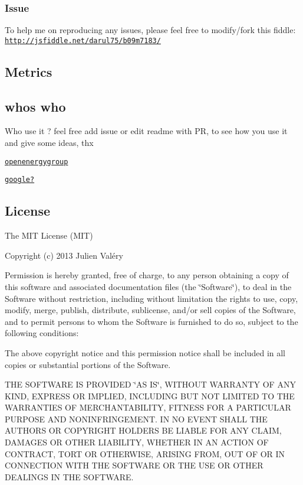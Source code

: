 \subsubsection*{Issue}

To help me on reproducing any issues, please feel free to modify/fork this fiddle\+: \href{http://jsfiddle.net/darul75/b09m7183/}{\tt http\+://jsfiddle.\+net/darul75/b09m7183/}

\subsection*{Metrics}

\href{https://nodei.co/npm/ng-slider/}{\tt }

\subsection*{who\textquotesingle{}s who}

Who use it ? feel free add issue or edit readme with PR, to see how you use it and give some ideas, thx

\href{https://www.openenergygroup.com/}{\tt openenergygroup}

\href{https://www.google.com}{\tt google?}

\subsection*{License}

The M\+IT License (M\+IT)

Copyright (c) 2013 Julien Valéry

Permission is hereby granted, free of charge, to any person obtaining a copy of this software and associated documentation files (the \char`\"{}\+Software\char`\"{}), to deal in the Software without restriction, including without limitation the rights to use, copy, modify, merge, publish, distribute, sublicense, and/or sell copies of the Software, and to permit persons to whom the Software is furnished to do so, subject to the following conditions\+:

The above copyright notice and this permission notice shall be included in all copies or substantial portions of the Software.

T\+HE S\+O\+F\+T\+W\+A\+RE IS P\+R\+O\+V\+I\+D\+ED \char`\"{}\+A\+S I\+S\char`\"{}, W\+I\+T\+H\+O\+UT W\+A\+R\+R\+A\+N\+TY OF A\+NY K\+I\+ND, E\+X\+P\+R\+E\+SS OR I\+M\+P\+L\+I\+ED, I\+N\+C\+L\+U\+D\+I\+NG B\+UT N\+OT L\+I\+M\+I\+T\+ED TO T\+HE W\+A\+R\+R\+A\+N\+T\+I\+ES OF M\+E\+R\+C\+H\+A\+N\+T\+A\+B\+I\+L\+I\+TY, F\+I\+T\+N\+E\+SS F\+OR A P\+A\+R\+T\+I\+C\+U\+L\+AR P\+U\+R\+P\+O\+SE A\+ND N\+O\+N\+I\+N\+F\+R\+I\+N\+G\+E\+M\+E\+NT. IN NO E\+V\+E\+NT S\+H\+A\+LL T\+HE A\+U\+T\+H\+O\+RS OR C\+O\+P\+Y\+R\+I\+G\+HT H\+O\+L\+D\+E\+RS BE L\+I\+A\+B\+LE F\+OR A\+NY C\+L\+A\+IM, D\+A\+M\+A\+G\+ES OR O\+T\+H\+ER L\+I\+A\+B\+I\+L\+I\+TY, W\+H\+E\+T\+H\+ER IN AN A\+C\+T\+I\+ON OF C\+O\+N\+T\+R\+A\+CT, T\+O\+RT OR O\+T\+H\+E\+R\+W\+I\+SE, A\+R\+I\+S\+I\+NG F\+R\+OM, O\+UT OF OR IN C\+O\+N\+N\+E\+C\+T\+I\+ON W\+I\+TH T\+HE S\+O\+F\+T\+W\+A\+RE OR T\+HE U\+SE OR O\+T\+H\+ER D\+E\+A\+L\+I\+N\+GS IN T\+HE S\+O\+F\+T\+W\+A\+RE. 